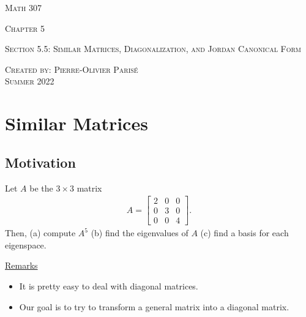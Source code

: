 \documentclass[12pt,a4paper]{article}
\newcounter{example}[section]
\begin{document}
\thispagestyle{empty}

\begin{center}
\vspace*{2.5cm}

{\Huge \textsc{Math 307}}

\vspace*{2cm}

{\LARGE \textsc{Chapter 5}} 

\vspace*{0.75cm}

\noindent\textsc{Section 5.5: Similar Matrices, Diagonalization, and Jordan Canonical Form}

\vspace*{0.75cm}

\tableofcontents

\vfill

\noindent \textsc{Created by: Pierre-Olivier Paris{\'e}} \\
\textsc{Summer 2022}
\end{center}

\newpage

\section{Similar Matrices}

	\subsection{Motivation}
	\begin{example}
	Let $A$ be the $3 \times 3$ matrix
		\begin{align*}
		A = \begin{bmatrix}
		2 & 0 & 0 \\ 0 & 3 & 0 \\ 0 & 0 & 4 
		\end{bmatrix} .
		\end{align*}
	Then, (a) compute $A^5$ (b) find the eigenvalues of $A$ (c) find a basis for each eigenspace.
	\end{example}
	
	\vfill
	
	\underline{Remarks}
	\begin{itemize}
	\item It is pretty easy to deal with diagonal matrices.
	\item Our goal is to try to transform a general matrix into a diagonal matrix.
	\end{itemize}
	
\end{document}
